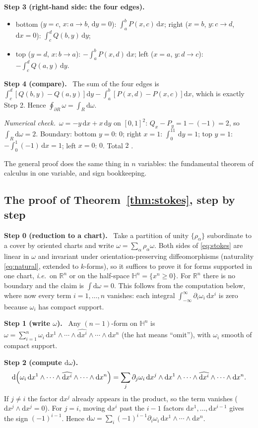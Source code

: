 \documentclass[11pt,a4paper]{article}
\newcounter{thm}[section]
\numberwithin{equation}{section}
\theoremstyle{definition}
\theoremstyle{plain}
\newcommand{\numcheck}{\textit{Numerical check.}\ }
\newcommand{\Step}[2]{\textbf{Step #1 (#2).}\ }
\newcommand{\R}{\mathbb{R}}
\newcommand{\dd}{\mathrm{d}}
\newcommand{\ie}{\emph{i.e.}\ }
\begin{document}
\Step{3}{right-hand side: the four edges}
\begin{itemize}
\item bottom ($y=c$, $x:a\to b$, $\dd y=0$): $\int_a^bP(x,c)\,\dd x$; right ($x=b$, $y:c\to d$, $\dd x=0$): $\int_c^dQ(b,y)\,\dd y$;
\item top ($y=d$, $x:b\to a$): $-\int_a^bP(x,d)\,\dd x$; left ($x=a$, $y:d\to c$): $-\int_c^dQ(a,y)\,\dd y$.
\end{itemize}

\Step{4}{compare} The sum of the four edges is $\int_c^d[Q(b,y)-Q(a,y)]\dd y-\int_a^b[P(x,d)-P(x,c)]\dd x$, which is exactly Step 2. Hence $\oint_{\partial R}\omega=\int_R\dd\omega$.

\numcheck $\omega=-y\,\dd x+x\,\dd y$ on $[0,1]^2$: $Q_x-P_y=1-(-1)=2$, so $\int_R\dd\omega=2$. Boundary: bottom $y=0$: $0$; right $x=1$: $\int_0^11\,\dd y=1$; top $y=1$: $-\int_0^1(-1)\,\dd x=1$; left $x=0$: $0$. Total $2$ \checkmark.

The general proof does the same thing in $n$ variables: the fundamental theorem of calculus in one variable, and sign bookkeeping.

\subsection{The proof of Theorem~\ref{thm:stokes}, step by step}\label{sec:stokesproof}

\Step{0}{reduction to a chart} Take a partition of unity $\{\rho_\alpha\}$ subordinate to a cover by oriented charts and write $\omega=\sum_\alpha\rho_\alpha\omega$. Both sides of \eqref{eq:stokes} are linear in $\omega$ and invariant under orientation-preserving diffeomorphisms (naturality \eqref{eq:natural}, extended to $k$-forms), so it suffices to prove it for forms supported in one chart, \ie on $\R^n$ or on the half-space $\mathbb H^n=\{x^n\ge0\}$. For $\R^n$ there is no boundary and the claim is $\int\dd\omega=0$. This follows from the computation below, where now every term $i=1,\dots,n$ vanishes: each integral $\int_{-\infty}^\infty\partial_i\omega_i\,\dd x^i$ is zero because $\omega_i$ has compact support.

\Step{1}{write $\omega$} Any $(n-1)$-form on $\mathbb H^n$ is $\omega=\sum_{i=1}^n\omega_i\,\dd x^1\wedge\cdots\wedge\widehat{\dd x^i}\wedge\cdots\wedge\dd x^n$ (the hat means ``omit''), with $\omega_i$ smooth of compact support.

\Step{2}{compute $\dd\omega$}
\[
\dd\Bigl(\omega_i\,\dd x^1\wedge\cdots\wedge\widehat{\dd x^i}\wedge\cdots\wedge\dd x^n\Bigr)=\sum_j\partial_j\omega_i\,\dd x^j\wedge\dd x^1\wedge\cdots\wedge\widehat{\dd x^i}\wedge\cdots\wedge\dd x^n .
\]
If $j\ne i$ the factor $\dd x^j$ already appears in the product, so the term vanishes ($\dd x^j\wedge\dd x^j=0$). For $j=i$, moving $\dd x^i$ past the $i-1$ factors $\dd x^1,\dots,\dd x^{i-1}$ gives the sign $(-1)^{i-1}$. Hence $\dd\omega=\sum_i(-1)^{i-1}\partial_i\omega_i\,\dd x^1\wedge\cdots\wedge\dd x^n$.
\end{document}
